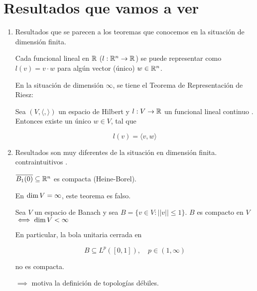 \section{Resultados que vamos a ver}

\begin{enumerate}
    \item Resultados que se parecen a los teoremas que conocemos en la situación de dimensión finita.

    \begin{fexample}
        Cada funcional lineal en $\mathbb{R}$ ($l:\mathbb{R}^{n}\to \mathbb{R}$) se puede representar como $l(v)=v\cdot w$ para algún vector (único) $w\in\mathbb{R}^n$.

    En la situación de dimensión $\infty$, se tiene el Teorema de Representación de Riesz:

    \begin{ftheorem}
        Sea $(V,\langle,\rangle)$ un espacio de Hilbert y $l:V\to \mathbb{R}$ un funcional lineal \color{red}continuo \color{black}. Entonces existe un único $w\in V$, tal que

        \[l(v)=\langle v,w\rangle\]
    \end{ftheorem}
    \end{fexample}

    \item Resultados son muy diferentes de la situación en dimensión finita. \color{red} contraintuitivos \color{black}.

    \begin{fexample}
        $\overline{B_1(0)}\subseteq \mathbb{R}^n$ es compacta (Heine-Borel). 

        En $\operatorname{dim} V=\infty$, este teorema es falso.
    \end{fexample}
    
    \begin{fproposition}
        Sea $V$ un espacio de Banach y sea $B=\{v\in V:||v||\leq 1\}$. $B$ es compacto en $V$ $\iff \operatorname{dim} V<\infty$
    \end{fproposition}

    \begin{fexample}
        En particular, la bola unitaria cerrada en

        \[B\subseteq L^p([0,1]),\quad p\in (1,\infty)\]

        no es compacta.

        \color{blue}$\implies$ motiva la definición de \color{red} topologías débiles.
    \end{fexample}
    
\end{enumerate}
